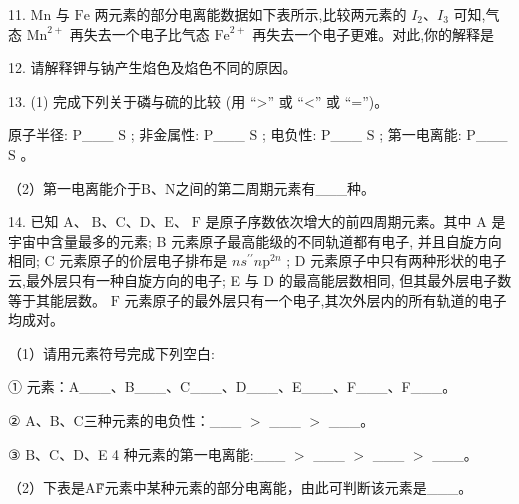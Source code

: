 \documentclass[10pt]{article}
\begin{document}
11. \(\mathrm{{Mn}}\) 与 \(\mathrm{{Fe}}\) 两元素的部分电离能数据如下表所示,比较两元素的 \({I}_{2}\text{、}{I}_{3}\) 可知,气态 \({\mathrm{{Mn}}}^{2 + }\) 再失去一个电子比气态 \({\mathrm{{Fe}}}^{2 + }\) 再失去一个电子更难。对此,你的解释是

12. 请解释钾与钠产生焰色及焰色不同的原因。

\begin{center}
\end{center}

13. (1) 完成下列关于磷与硫的比较 (用 “>” 或 “<” 或 “=”)。

原子半径: P\_\_\_ \(\mathrm{S}\) ; 非金属性: P\_\_\_ \(\mathrm{S}\) ; 电负性: P\_\_\_ \(\mathrm{S}\) ; 第一电离能: P\_\_\_ \(\mathrm{S}\) 。

（2）第一电离能介于B、N之间的第二周期元素有\_\_\_种。

14. 已知 \(\mathrm{A}\text{、}\mathrm{\;B}\text{、}\mathrm{C}\text{、}\mathrm{D}\text{、}\mathrm{E}\text{、}\mathrm{\;F}\) 是原子序数依次增大的前四周期元素。其中 \(\mathrm{A}\) 是宇宙中含量最多的元素; B 元素原子最高能级的不同轨道都有电子, 并且自旋方向相同; C 元素原子的价层电子排布是 \(n{s}^{\prime \prime }n{\mathrm{p}}^{2n}\) ; D 元素原子中只有两种形状的电子云,最外层只有一种自旋方向的电子; E 与 D 的最高能层数相同, 但其最外层电子数等于其能层数。 \(\mathrm{F}\) 元素原子的最外层只有一个电子,其次外层内的所有轨道的电子均成对。

（1）请用元素符号完成下列空白:

① 元素：A\_\_\_、B\_\_\_、C\_\_\_、D\_\_\_、E\_\_\_、F\_\_\_、F\_\_\_。

② A、B、C三种元素的电负性：\_\_\_ \(>\) \_\_\_ \(>\) \_\_\_。

③ B、C、D、E 4 种元素的第一电离能:\_\_\_ \(>\) \_\_\_ \(>\) \_\_\_ \(>\) \_\_\_。

（2）下表是A\~F元素中某种元素的部分电离能，由此可判断该元素是\_\_\_。

\begin{center}
\end{center}
\end{document}
